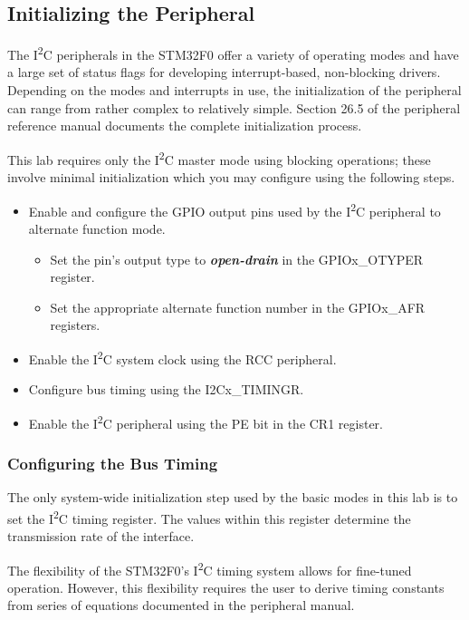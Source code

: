 \documentclass[openany,11pt,fleqn]{book} %
\begin{document}
\subsection{Initializing the Peripheral} \label{i2c_init}
   
    The I\textsuperscript{2}C peripherals in the STM32F0 offer a variety of operating modes and have a large set of status flags for developing interrupt-based, non-blocking drivers. Depending on the modes and interrupts in use, the initialization of the peripheral can range from rather complex to relatively simple. Section 26.5 of the peripheral reference manual documents the complete initialization process. 
    
    This lab requires only the I\textsuperscript{2}C master mode using blocking operations; these involve minimal initialization which you may configure using the following steps.
    
    \begin{itemize}
        \item Enable and configure the GPIO output pins used by the I\textsuperscript{2}C peripheral to alternate function mode.
        \begin{itemize}
            \item Set the pin's output type to \textbf{\textit{open-drain}} in the GPIOx\_OTYPER register. 
            \item Set the appropriate alternate function number in the GPIOx\_AFR registers. 
        \end{itemize}
        \item Enable the I\textsuperscript{2}C system clock using the RCC peripheral.
        \item Configure bus timing using the I2Cx\_TIMINGR.
        \item Enable the I\textsuperscript{2}C peripheral using the PE bit in the CR1 register.
    \end{itemize} 
     
    \subsubsection{Configuring the Bus Timing}
    The only system-wide initialization step used by the basic modes in this lab is to set the I\textsuperscript{2}C timing register. The values within this register determine the transmission rate of the interface. 
    
    The flexibility of the STM32F0's I\textsuperscript{2}C timing system allows for fine-tuned operation. However, this flexibility requires the user to derive timing constants from series of equations documented in the peripheral manual. 
    
\end{document}
